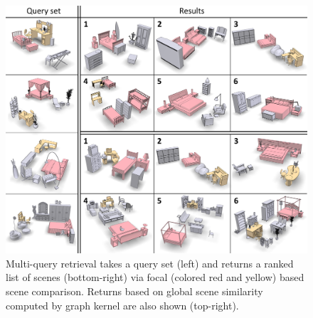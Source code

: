 
\begin{figure}[t] \centering
    \includegraphics[width=0.98\linewidth]{fig/img/xu_sig14_multiquery}
        \vspace{-0.4cm}
    \caption{
    Multi-query retrieval takes a query set (left) and returns a ranked list of scenes (bottom-right) via focal (colored red and yellow) based scene comparison.
    Returns based on global scene similarity computed by graph kernel are also shown (top-right).
    }
    \vspace{-0.6cm}    
    \label{fig:multiquery}
\end{figure}
